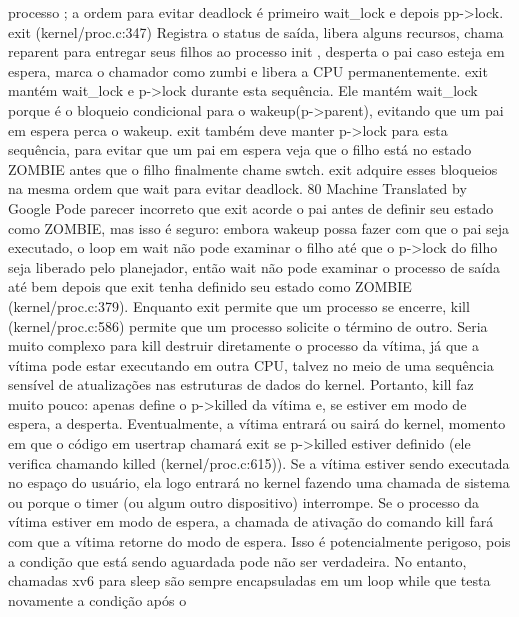 processo ;  a  ordem  para  evitar  deadlock  é  primeiro  wait_lock  e  depois  pp->lock.  exit  (kernel/proc.c:347)  Registra  o  status  
de  saída,  libera  
alguns  recursos,  chama  reparent  para  entregar  seus  filhos  ao  processo  init ,  desperta  o  pai  caso  esteja  em  espera,  
marca  o  chamador  como  zumbi  e  libera  a  CPU  permanentemente.  exit  mantém  wait_lock  e  p->lock  durante  esta  
sequência.  Ele  mantém  wait_lock  porque  é  o  bloqueio  condicional  para  o  wakeup(p->parent),  evitando  que  um  pai  em  
espera  perca  o  wakeup.  exit  também  deve  manter  p->lock  para  esta  sequência,  para  evitar  que  um  pai  em  espera  veja  
que  o  filho  está  no  estado  ZOMBIE  antes  que  o  filho  finalmente  chame  swtch.  exit  adquire  esses  bloqueios  na  mesma  
ordem  que  wait  para  evitar  deadlock.
 80
Machine Translated by Google
 Pode  parecer  incorreto  que  exit  acorde  o  pai  antes  de  definir  seu  estado  como  ZOMBIE,  mas  isso  é  seguro:  embora  
wakeup  possa  fazer  com  que  o  pai  seja  executado,  o  loop  em  wait  não  pode  examinar  o  filho  até  que  o  p->lock  do  filho  seja  
liberado  pelo  planejador,  então  wait  não  pode  examinar  o  processo  de  saída  até  bem  depois  que  exit  tenha  definido  seu  
estado  como  ZOMBIE  (kernel/proc.c:379).
 Enquanto  exit  permite  que  um  processo  se  encerre,  kill  (kernel/proc.c:586)  permite  que  um  processo  solicite  o  término  
de  outro.  Seria  muito  complexo  para  kill  destruir  diretamente  o  processo  da  vítima,  já  que  a  vítima  pode  estar  executando  em  
outra  CPU,  talvez  no  meio  de  uma  sequência  sensível  de  atualizações  nas  estruturas  de  dados  do  kernel.  Portanto,  kill  faz  
muito  pouco:  apenas  define  o  p->killed  da  vítima  e,  se  estiver  em  modo  de  espera,  a  desperta.  Eventualmente,  a  vítima  
entrará  ou  sairá  do  kernel,  momento  em  que  o  código  em  usertrap  chamará  exit  se  p->killed  estiver  definido  (ele  verifica  
chamando  killed  (kernel/proc.c:615)).  Se  a  vítima  estiver  sendo  executada  no  espaço  do  usuário,  ela  logo  entrará  no  kernel  
fazendo  uma  chamada  de  sistema  ou  porque  o  timer  (ou  algum  outro  dispositivo)  interrompe.
 Se  o  processo  da  vítima  estiver  em  modo  de  espera,  a  chamada  de  ativação  do  comando  kill  fará  com  que  a  vítima  
retorne  do  modo  de  espera.  Isso  é  potencialmente  perigoso,  pois  a  condição  que  está  sendo  aguardada  pode  não  ser  verdadeira.
 No  entanto,  chamadas  xv6  para  sleep  são  sempre  encapsuladas  em  um  loop  while  que  testa  novamente  a  condição  após  o  
